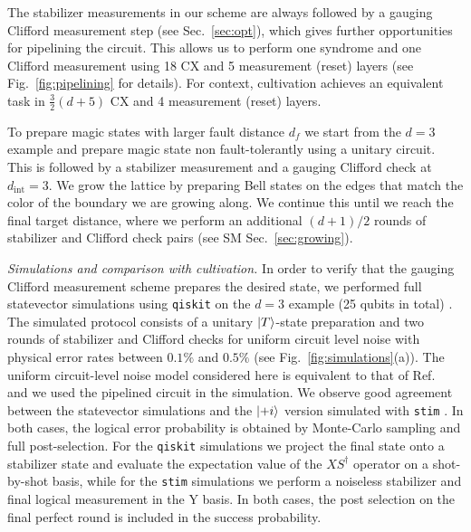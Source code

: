 \documentclass[aps,prx,twocolumn,secnumarabic,superscriptaddress,nofootinbib]{revtex4-2}
\begin{document}
The stabilizer measurements in our scheme are always followed by a gauging Clifford measurement step (see Sec.~\ref{sec:opt}),
which gives further opportunities for pipelining the circuit. This allows us to perform one syndrome and one Clifford measurement using 18 CX and 5 measurement (reset) layers (see Fig.~\ref{fig:pipelining} for details). For context, cultivation achieves an equivalent task in ${\frac 3 2 (d+5)}$ CX and 4 measurement (reset) layers.

To prepare magic states with larger fault distance $d_f$ we start from the $d=3$ example and prepare magic state non fault-tolerantly using a unitary circuit. This is followed by a stabilizer measurement and a gauging Clifford check at $d_\text{int}=3$. We grow the lattice by preparing Bell states on the edges that match the color of the boundary we are growing along. We continue this until we reach the final target distance, where we perform an additional $(d+1)/2$ rounds of stabilizer and Clifford check pairs (see SM Sec.~\ref{sec:growing}).

{\it Simulations and comparison with cultivation.} In order to verify that the gauging Clifford measurement scheme prepares the desired state, we performed full statevector simulations using \texttt{qiskit} on the $d=3$ example (25 qubits in total) \cite{aleksandrowicz_qiskit_2019}. The simulated protocol consists of a unitary $\ket T$-state preparation and two rounds of stabilizer and Clifford checks for uniform circuit level noise with physical error rates between $0.1\%$ and $0.5\%$ (see Fig.~\ref{fig:simulations}(a)). The uniform circuit-level noise model considered here is equivalent to that of Ref.~\cite{gidneyMagicStateCultivation2024} and we used the pipelined circuit in the simulation. We observe good agreement between the statevector simulations and the $\ket{+i}$ version simulated with \texttt{stim} \cite{gidney_stim_2021}. In both cases, the logical error probability is obtained by Monte-Carlo sampling and full post-selection. For the \texttt{qiskit} simulations we project the final state onto a stabilizer state and evaluate the expectation value of the %
$XS^\dagger$ operator on a shot-by-shot basis, while for the \texttt{stim} simulations we perform a noiseless stabilizer and final logical measurement in the Y basis. In both cases, the post selection on the final perfect round is included in the success probability.
\end{document}
